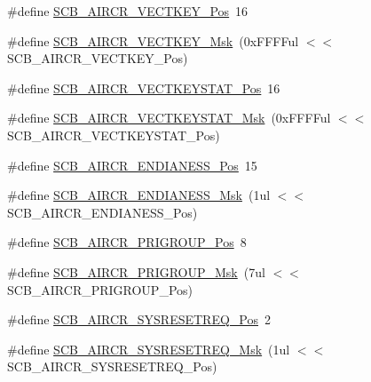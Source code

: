 \begin{DoxyCompactItemize}
\item 
\#define \hyperlink{group___c_m_s_i_s___c_m3___s_c_b_gaaa27c0ba600bf82c3da08c748845b640}{S\-C\-B\-\_\-\-A\-I\-R\-C\-R\-\_\-\-V\-E\-C\-T\-K\-E\-Y\-\_\-\-Pos}~16
\item 
\#define \hyperlink{group___c_m_s_i_s___c_m3___s_c_b_ga90c7cf0c490e7ae55f9503a7fda1dd22}{S\-C\-B\-\_\-\-A\-I\-R\-C\-R\-\_\-\-V\-E\-C\-T\-K\-E\-Y\-\_\-\-Msk}~(0x\-F\-F\-F\-Ful $<$$<$ S\-C\-B\-\_\-\-A\-I\-R\-C\-R\-\_\-\-V\-E\-C\-T\-K\-E\-Y\-\_\-\-Pos)
\item 
\#define \hyperlink{group___c_m_s_i_s___c_m3___s_c_b_gaec404750ff5ca07f499a3c06b62051ef}{S\-C\-B\-\_\-\-A\-I\-R\-C\-R\-\_\-\-V\-E\-C\-T\-K\-E\-Y\-S\-T\-A\-T\-\_\-\-Pos}~16
\item 
\#define \hyperlink{group___c_m_s_i_s___c_m3___s_c_b_gabacedaefeefc73d666bbe59ece904493}{S\-C\-B\-\_\-\-A\-I\-R\-C\-R\-\_\-\-V\-E\-C\-T\-K\-E\-Y\-S\-T\-A\-T\-\_\-\-Msk}~(0x\-F\-F\-F\-Ful $<$$<$ S\-C\-B\-\_\-\-A\-I\-R\-C\-R\-\_\-\-V\-E\-C\-T\-K\-E\-Y\-S\-T\-A\-T\-\_\-\-Pos)
\item 
\#define \hyperlink{group___c_m_s_i_s___c_m3___s_c_b_gad31dec98fbc0d33ace63cb1f1a927923}{S\-C\-B\-\_\-\-A\-I\-R\-C\-R\-\_\-\-E\-N\-D\-I\-A\-N\-E\-S\-S\-\_\-\-Pos}~15
\item 
\#define \hyperlink{group___c_m_s_i_s___c_m3___s_c_b_ga2f571f93d3d4a6eac9a3040756d3d951}{S\-C\-B\-\_\-\-A\-I\-R\-C\-R\-\_\-\-E\-N\-D\-I\-A\-N\-E\-S\-S\-\_\-\-Msk}~(1ul $<$$<$ S\-C\-B\-\_\-\-A\-I\-R\-C\-R\-\_\-\-E\-N\-D\-I\-A\-N\-E\-S\-S\-\_\-\-Pos)
\item 
\#define \hyperlink{group___c_m_s_i_s___c_m3___s_c_b_gaca155deccdeca0f2c76b8100d24196c8}{S\-C\-B\-\_\-\-A\-I\-R\-C\-R\-\_\-\-P\-R\-I\-G\-R\-O\-U\-P\-\_\-\-Pos}~8
\item 
\#define \hyperlink{group___c_m_s_i_s___c_m3___s_c_b_ga8be60fff03f48d0d345868060dc6dae7}{S\-C\-B\-\_\-\-A\-I\-R\-C\-R\-\_\-\-P\-R\-I\-G\-R\-O\-U\-P\-\_\-\-Msk}~(7ul $<$$<$ S\-C\-B\-\_\-\-A\-I\-R\-C\-R\-\_\-\-P\-R\-I\-G\-R\-O\-U\-P\-\_\-\-Pos)
\item 
\#define \hyperlink{group___c_m_s_i_s___c_m3___s_c_b_gaffb2737eca1eac0fc1c282a76a40953c}{S\-C\-B\-\_\-\-A\-I\-R\-C\-R\-\_\-\-S\-Y\-S\-R\-E\-S\-E\-T\-R\-E\-Q\-\_\-\-Pos}~2
\item 
\#define \hyperlink{group___c_m_s_i_s___c_m3___s_c_b_gaae1181119559a5bd36e62afa373fa720}{S\-C\-B\-\_\-\-A\-I\-R\-C\-R\-\_\-\-S\-Y\-S\-R\-E\-S\-E\-T\-R\-E\-Q\-\_\-\-Msk}~(1ul $<$$<$ S\-C\-B\-\_\-\-A\-I\-R\-C\-R\-\_\-\-S\-Y\-S\-R\-E\-S\-E\-T\-R\-E\-Q\-\_\-\-Pos)
\item 
$$
\end{DoxyCompactItemize}
